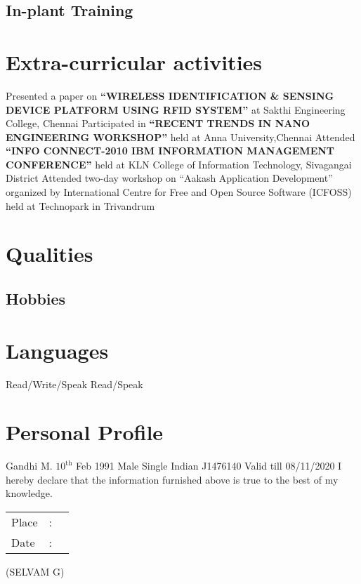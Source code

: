 \documentclass [a4paper,11pt]{moderncv}
\begin{document}
\subsection {In-plant Training}
\section {Extra-curricular activities}
\cvline {} {Presented a paper on \textbf{``WIRELESS IDENTIFICATION \& SENSING DEVICE PLATFORM USING RFID SYSTEM''} at Sakthi Engineering College, Chennai}
\cvline {} {Participated in \textbf{``RECENT TRENDS IN NANO ENGINEERING WORKSHOP''} held at Anna University,Chennai}
\cvline {} {Attended \textbf{``INFO CONNECT-2010 IBM INFORMATION MANAGEMENT CONFERENCE''} held at KLN College of Information Technology, Sivagangai District}
\cvline {} {Attended two-day workshop on ``Aakash Application Development'' organized by International Centre for Free and Open Source Software (ICFOSS) held at Technopark in Trivandrum}
\section {Qualities}
\subsection{Hobbies}

\section{Languages}
 {Read/Write/Speak}
 {Read/Speak}

\section {Personal Profile}
 {Gandhi M.}
 {$10^{\mathrm{th}}$ Feb 1991}
 {Male}
 {Single}
 {Indian}
 {J1476140 Valid till 08/11/2020}
\vspace {4pt}
I hereby declare that the information furnished above is true to the best of my knowledge.\\

\begin{tabular}{|l c l|}
Place \hspace{4pt} &:&\\
Date\hspace{4pt}  &:& \\
\end{tabular}
\begin{flushright}
(SELVAM G)
\end{flushright}
\end{document}
